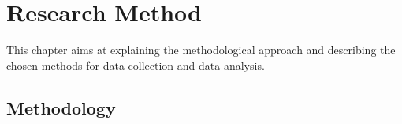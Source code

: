 \chapter{Research Method}
This chapter aims at explaining the methodological approach and describing the chosen methods for data collection and data analysis. 

\section{Methodology}





